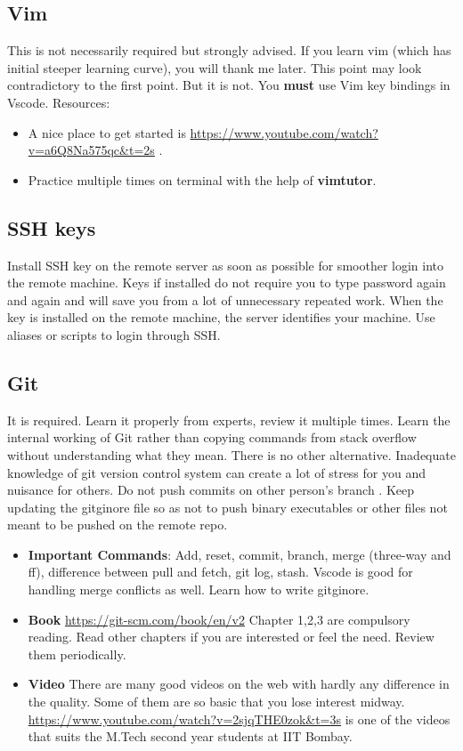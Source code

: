 \documentclass{article}
\begin{document}
\subsection{Vim}
This is not necessarily required but strongly advised. If you learn vim (which has initial steeper learning curve), you will thank me later.
This point may look contradictory to the first point. But it is not. You \textbf{must} use Vim key bindings in Vscode.
Resources:
\begin{itemize}
    \item A nice place to get started is \url{https://www.youtube.com/watch?v=a6Q8Na575qc&t=2s} .
    \item Practice multiple times on terminal with the help of \textbf{vimtutor}.
\end{itemize}
\subsection{SSH keys}

Install SSH key on the remote server as soon as possible for smoother login into the remote machine. Keys if installed do not require you to type password again and again and will save you from a lot of unnecessary repeated work. When the key is installed on the remote machine, the server identifies your machine. Use aliases or scripts to login through SSH.

\subsection{Git}
It is required. Learn it properly from experts, review it multiple times. Learn the internal working of Git rather than copying commands from stack overflow without understanding what they mean. There is no other alternative.
Inadequate knowledge of git version control system can create a lot of stress for you and nuisance for others. Do not push commits on other person's branch . Keep updating the gitginore file so as not to push binary executables or other files not meant to be pushed on the remote repo.
\begin{itemize}
    \item \textbf{Important Commands}: Add, reset, commit, branch, merge (three-way and ff), difference between pull and fetch, git log, stash. Vscode is good for handling merge conflicts as well. Learn how to write gitginore.
    \item \textbf{Book} \url{https://git-scm.com/book/en/v2} Chapter 1,2,3 are compulsory reading.
          Read other chapters if you are interested or feel the need. Review them periodically.
    \item \textbf{Video} There are many good videos on the web with hardly any difference in the quality. Some of them are so basic that you lose interest midway. \url{https://www.youtube.com/watch?v=2sjqTHE0zok&t=3s} is one of the videos that suits the M.Tech second year students at IIT Bombay.
\end{itemize}
\end{document}
